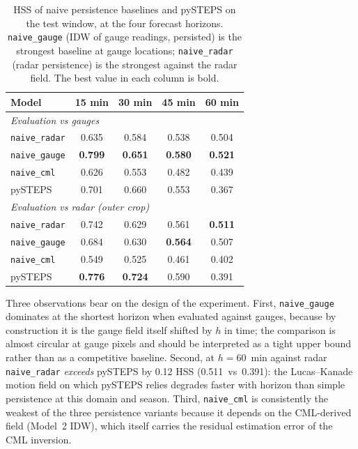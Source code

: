 \documentclass[12pt, a4paper]{article}
\begin{document}
\begin{table}[h]
\centering
\caption{HSS of naive persistence baselines and pySTEPS on the test
window, at the four forecast horizons. \texttt{naive\_gauge} (IDW of
gauge readings, persisted) is the strongest baseline at gauge
locations; \texttt{naive\_radar} (radar persistence) is the strongest
against the radar field. The best value in each column is bold.}
\label{tab:naive_hss}
\begin{tabular}{lcccc}
\toprule
Model & 15 min & 30 min & 45 min & 60 min \\
\midrule
\multicolumn{5}{l}{\textit{Evaluation vs gauges}} \\
\texttt{naive\_radar}    & 0.635 & 0.584 & 0.538 & 0.504 \\
\texttt{naive\_gauge}    & \textbf{0.799} & \textbf{0.651} & \textbf{0.580} & \textbf{0.521} \\
\texttt{naive\_cml}      & 0.626 & 0.553 & 0.482 & 0.439 \\
pySTEPS                  & 0.701 & 0.660 & 0.553 & 0.367 \\
\midrule
\multicolumn{5}{l}{\textit{Evaluation vs radar (outer crop)}} \\
\texttt{naive\_radar}    & 0.742 & 0.629 & 0.561 & \textbf{0.511} \\
\texttt{naive\_gauge}    & 0.684 & 0.630 & \textbf{0.564} & 0.507 \\
\texttt{naive\_cml}      & 0.549 & 0.525 & 0.461 & 0.402 \\
pySTEPS                  & \textbf{0.776} & \textbf{0.724} & 0.590 & 0.391 \\
\bottomrule
\end{tabular}
\end{table}

Three observations bear on the design of the experiment. First,
\texttt{naive\_gauge} dominates at the shortest horizon when evaluated
against gauges, because by construction it is the gauge field itself
shifted by $h$ in time; the comparison is almost circular at gauge
pixels and should be interpreted as a tight upper bound rather than as
a competitive baseline. Second, at $h\!=\!60$~min against radar
\texttt{naive\_radar} \emph{exceeds} pySTEPS by 0.12 HSS
(0.511~vs~0.391): the Lucas--Kanade motion field on which pySTEPS
relies degrades faster with horizon than simple persistence at this
domain and season. Third, \texttt{naive\_cml} is consistently the
weakest of the three persistence variants because it depends on the
CML-derived field (Model~2 IDW), which itself carries the residual
estimation error of the CML inversion.
\end{document}

